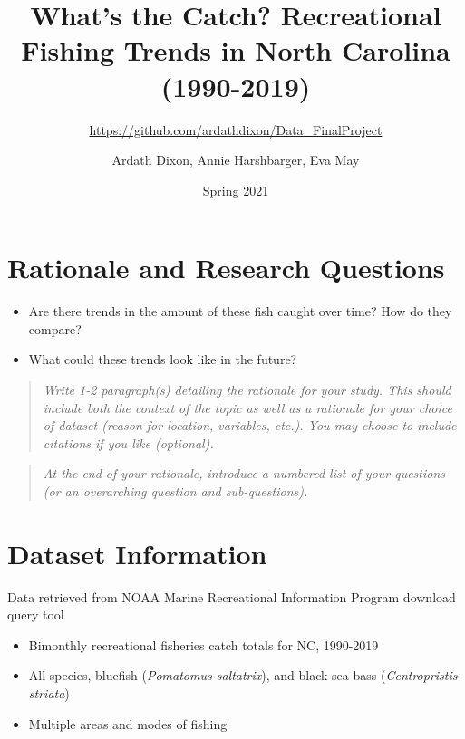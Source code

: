 \documentclass[
  12pt,
]{article}
\title{What's the Catch? Recreational Fishing Trends in North Carolina
(1990-2019)}
\subtitle{\url{https://github.com/ardathdixon/Data_FinalProject}}
\author{Ardath Dixon, Annie Harshbarger, Eva May}
\date{Spring 2021}
\begin{document}
\maketitle

\newpage
\tableofcontents 
\newpage
\listoftables 
\newpage
\listoffigures 
\newpage

\hypertarget{rationale-and-research-questions}{%
\section{Rationale and Research
Questions}\label{rationale-and-research-questions}}

\begin{itemize}
\item
  Are there trends in the amount of these fish caught over time? How do
  they compare?
\item
  What could these trends look like in the future?
\end{itemize}

\begin{quote}
\emph{Write 1-2 paragraph(s) detailing the rationale for your study.
This should include both the context of the topic as well as a rationale
for your choice of dataset (reason for location, variables, etc.). You
may choose to include citations if you like (optional).}
\end{quote}

\begin{quote}
\emph{At the end of your rationale, introduce a numbered list of your
questions (or an overarching question and sub-questions).}
\end{quote}

\newpage

\hypertarget{dataset-information}{%
\section{Dataset Information}\label{dataset-information}}

Data retrieved from NOAA Marine Recreational Information Program
download query tool

\begin{itemize}
\item
  Bimonthly recreational fisheries catch totals for NC, 1990-2019
\item
  All species, bluefish (\emph{Pomatomus saltatrix}), and black sea bass
  (\emph{Centropristis striata})
\item
  Multiple areas and modes of fishing
\end{itemize}
\end{document}
